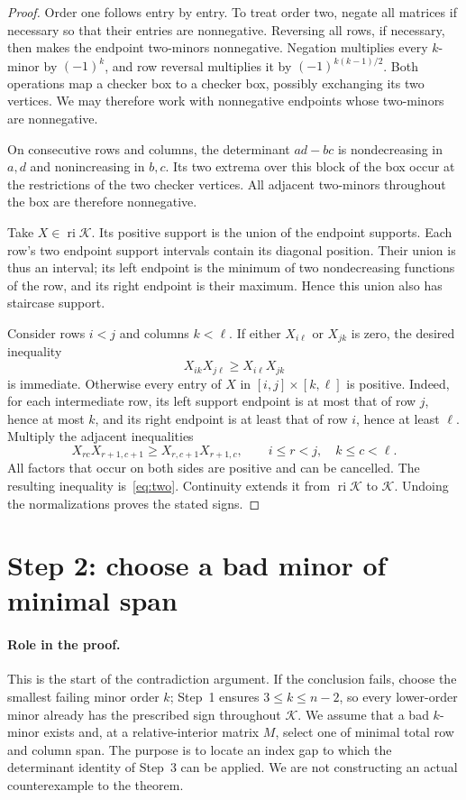 \documentclass[10pt,a4paper]{article}
\theoremstyle{definition}
\theoremstyle{remark}
\numberwithin{equation}{section}
\newcommand{\K}{\mathcal K}
\DeclareMathOperator{\ri}{ri}
\begin{document}
\begin{proof}
Order one follows entry by entry. To treat order two, negate all
matrices if necessary so that their entries are nonnegative. Reversing
all rows, if necessary, then makes the endpoint two-minors
nonnegative. Negation multiplies every $k$-minor by $(-1)^k$, and
row reversal multiplies it by $(-1)^{k(k-1)/2}$. Both operations map a
checker box to a checker box, possibly exchanging its two vertices.
We may therefore work with nonnegative endpoints whose two-minors
are nonnegative.

On consecutive rows and columns, the determinant $ad-bc$ is
nondecreasing in $a,d$ and nonincreasing in $b,c$. Its two extrema
over this block of the box occur at the restrictions of the two checker
vertices. All adjacent two-minors throughout the box are therefore
nonnegative.

Take $X\in\ri\K$. Its positive support is the union of the endpoint
supports. Each row's two endpoint support intervals contain its
diagonal position. Their union is thus an interval; its left endpoint
is the minimum of two nondecreasing functions of the row, and its
right endpoint is their maximum. Hence this union also has staircase
support.

Consider rows $i<j$ and columns $k<\ell$. If either $X_{i\ell}$ or
$X_{jk}$ is zero, the desired inequality
\begin{equation}\label{eq:two}
 X_{ik}X_{j\ell}\geq X_{i\ell}X_{jk}
\end{equation}
is immediate. Otherwise every entry of $X$ in
$[i,j]\times[k,\ell]$ is positive. Indeed, for each intermediate row,
its left support endpoint is at most that of row $j$, hence at most
$k$, and its right endpoint is at least that of row $i$, hence at
least $\ell$. Multiply the adjacent inequalities
\[
 X_{rc}X_{r+1,c+1}\geq X_{r,c+1}X_{r+1,c},
 \qquad i\leq r<j,\quad k\leq c<\ell.
\]
All factors that occur on both sides are positive and can be
cancelled. The resulting inequality is~\eqref{eq:two}.
Continuity extends it from $\ri\K$ to $\K$. Undoing the
normalizations proves the stated signs.
\end{proof}


\section{Step 2: choose a bad minor of minimal span}\label{sec:select}

\paragraph{Role in the proof.}
This is the start of the contradiction argument. If the conclusion
fails, choose the smallest failing minor order $k$; Step~1 ensures
$3\leq k\leq n-2$, so every lower-order minor already has the prescribed
sign throughout $\K$. We assume that a bad $k$-minor exists and, at a
relative-interior matrix $M$, select one of minimal total row and column
span. The purpose is to locate an index gap to which the determinant
identity of Step~3 can be applied. We are not constructing an actual
counterexample to the theorem.
\end{document}
